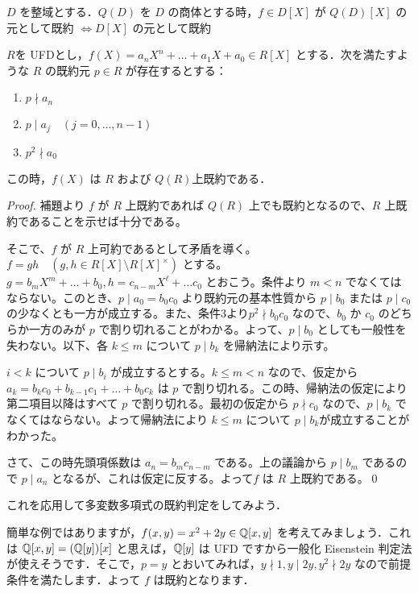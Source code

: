 \documentclass[a4j]{jsarticle}
\newcommand{\divs}{ \mid }
\begin{document}
\begin{lemma}
 $D$ を整域とする．$Q(D)$ を $D$ の商体とする時，$f \in D[X]$ が $Q(D)[X]$ の元として既約 $\Leftrightarrow D[X]$ の元として既約
\end{lemma}

\begin{theorem}
 $R$を UFDとし，$f(X) = a_n X^n + \dots + a_1 X + a_0 \in R[X]$ とする．次を満たすような $R$ の既約元 $p \in R$ が存在するとする：
 \begin{enumerate}
  \item $p \nmid a_n$
  \item $p \divs a_j \quad (j = 0, \dots, n-1)$
  \item $p^2 \nmid a_0$
 \end{enumerate}
 この時，$f(X)$ は $R$ および $Q(R)$上既約である．
\end{theorem}

\begin{proof}
 補題より $f$ が $R$ 上既約であれば $Q(R)$ 上でも既約となるので、$R$ 上既約であることを示せば十分である。

 そこで、$f$ が $R$ 上可約であるとして矛盾を導く。$f = gh \quad (g, h \in R[X] \setminus R[X]^\times)$ とする。$g = b_mX^m + \dots + b_0, h = c_{n-m} X^\ell + \dots c_0$ とおこう。条件より $m < n$ でなくてはならない。このとき、$p \mid a_0 = b_0 c_0$ より既約元の基本性質から $p \mid b_0$ または $p \mid c_0$ の少なくとも一方が成立する。また、条件$3$より$p^2 \nmid b_0 c_0$ なので、$b_0$ か $c_0$ のどちらか一方のみが $p$ で割り切れることがわかる。よって、$p \mid b_0$ としても一般性を失わない。以下、各 $k \leq m$ について $p \mid b_k$ を帰納法により示す。

 $i < k$ について $p \mid b_i$ が成立するとする。$k \leq m < n$ なので、仮定から $a_k = b_k c_0 + b_{k-1} c_1 + \dots + b_0 c_k$ は $p$ で割り切れる。この時、帰納法の仮定により第二項目以降はすべて $p$ で割り切れる。最初の仮定から $p \nmid c_0$ なので、$p \mid b_k$ でなくてはならない。よって帰納法により $k \leq m$ について $p \mid b_k$が成立することがわかった。

 さて、この時先頭項係数は $a_n = b_m c_{n - m}$ である。上の議論から $p \mid b_m$ であるので $p \mid a_n$ となるが、これは仮定に反する。よって$f$ は $R$ 上既約である。\qed
\end{proof}

これを応用して多変数多項式の既約判定をしてみよう．

簡単な例ではありますが，$f(x, y) = x^2 + 2y \in \mathbb{Q}[x, y]$ を考えてみましょう．これは $\mathbb{Q}[x, y] = (\mathbb{Q}[y])[x]$ と思えば，$\mathbb{Q}[y]$ は UFD ですから一般化 Eisenstein 判定法が使えそうです．そこで，$p = y$ とおいてみれば，$y \nmid 1, y \mid 2y, y^2 \nmid 2y$ なので前提条件を満たします．よって $f$ は既約となります．
\end{document}
